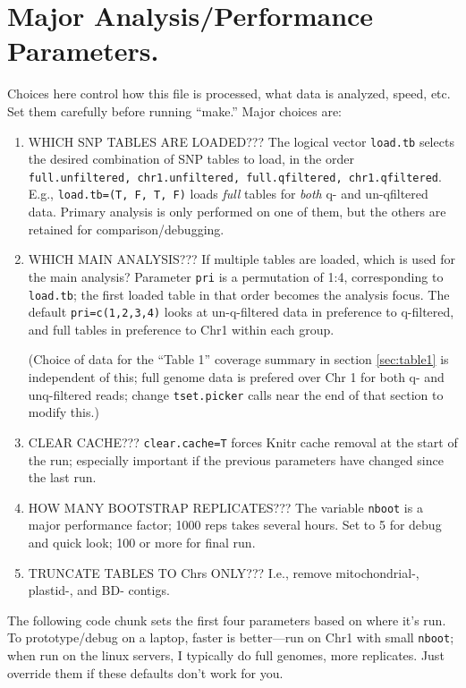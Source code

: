 \documentclass{article}\usepackage[]{graphicx}\usepackage[]{color}
\begin{document}
\section{Major Analysis/Performance Parameters.}
\label{sec:params}

Choices here control how this file is processed, what data is analyzed, speed, etc.  
Set them carefully before running ``make.''  Major choices are:
\begin{enumerate}

  \item WHICH SNP TABLES ARE LOADED???  The logical vector {\tt load.tb} selects the desired 
    combination of SNP tables to load, in the  order
      {\tt full.unfiltered, chr1.unfiltered, full.qfiltered,  chr1.qfiltered}.   
    E.g., {\tt load.tb=(T, F, T, F)} loads \emph{full} tables for \emph{both} q- and un-qfiltered 
    data.  Primary analysis is only performed on one of them, but the others are retained for 
    comparison/debugging.
    
  \item WHICH MAIN ANALYSIS???  If multiple tables are loaded, which is used for the main analysis? 
    Parameter {\tt pri} is a permutation of 1:4, corresponding to {\tt load.tb}; the first loaded
    table in that order becomes the analysis focus.  The default {\tt pri=c(1,2,3,4)} looks at 
    un-q-filtered data in preference to q-filtered, and full tables in preference to Chr1 within 
    each group.  
    
    (Choice of data for the ``Table 1'' coverage summary in section \ref{sec:table1} is independent
    of this; full genome data is prefered over Chr 1 for both q- and unq-filtered reads; change 
    {\tt tset.picker} calls near the end of that section to modify this.)

  \item CLEAR CACHE???  {\tt clear.cache=T} forces Knitr cache removal at the start of the run; 
    especially important if the previous parameters have changed since the last run.

  \item HOW MANY BOOTSTRAP REPLICATES???  The variable {\tt nboot} is a major performance factor; 
    1000 reps takes several hours.  Set to 5 for debug and quick look; 100 or more for final run.
    
  \item TRUNCATE TABLES TO Chrs ONLY???  I.e., remove mitochondrial-, plastid-, and BD- contigs.

\end{enumerate}
The following code chunk sets the first four parameters based on where it's run.  To prototype/debug
on a laptop, faster is better---run on Chr1 with small {\tt nboot}; when run on the linux servers, I 
typically do full genomes, more replicates.  Just override them if these defaults don't work for you.
\end{document}
